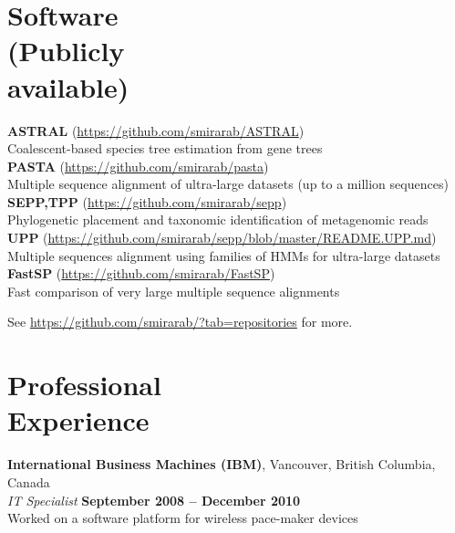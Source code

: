 \documentclass[margin,line,letterpaper]{resume}
\begin{document}
\begin{resume}
\section{\mysidestyle Software\\(Publicly\\available)}
\textbf{ASTRAL} (\url{https://github.com/smirarab/ASTRAL})\\
Coalescent-based species tree estimation from  gene trees\vspace{2mm}\\
\textbf{PASTA} (\url{https://github.com/smirarab/pasta})\\ 
Multiple sequence alignment of ultra-large datasets (up to a million sequences)\vspace{2mm}\\
\textbf{SEPP,TPP} (\url{https://github.com/smirarab/sepp})\\
Phylogenetic placement and taxonomic identification of metagenomic reads\vspace{2mm}\\
\textbf{UPP} (\url{https://github.com/smirarab/sepp/blob/master/README.UPP.md})\\
Multiple sequences alignment using families of HMMs for ultra-large datasets\vspace{2mm}\\
\textbf{FastSP} (\url{https://github.com/smirarab/FastSP})\\
Fast comparison of very large multiple sequence alignments  

See \url{https://github.com/smirarab/?tab=repositories} for more. 
    \section{\mysidestyle Professional\\Experience}

    \textbf{International Business Machines (IBM)}, Vancouver, British Columbia, Canada
\vspace{2mm}\\\vspace{1mm}%
    \textsl{IT Specialist} \hfill \textbf{September 2008 -- December 2010}\\
    Worked on a software platform for wireless pace-maker devices


\end{resume}
\end{document}
